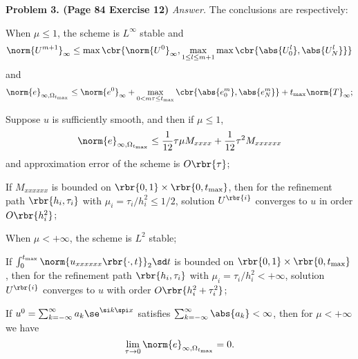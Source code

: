 \documentclass[english, nochinese]{pnote}
\begin{document}
\textbf{Problem 3. (Page 84 Exercise 12)} \textit{Answer.} The conclusions are respectively:
\begin{partlist}
\item When $ \mu \le 1 $, the scheme is $L^{\infty}$ stable and
\begin{equation}
\norm{U^{ m + 1 }}_{\infty} \le \max \cbr{ \norm{U^0}_{\infty}, \max_{ 1 \le l \le m + 1 } \max \cbr{ \abs{U_0^l}, \abs{U_N^l} } }
\end{equation}
and
\begin{equation}
\norm{e}_{ \infty, \Omega_{t_{\text{max}}} } \le \norm{e^0}_{\infty} + \max_{ 0 < m \tau \le t_{\text{max}}} \cbr{ \abs{e_0^m}, \abs{e_N^m} } + t_{\text{max}} \norm{T}_{\infty};
\end{equation}
\item Suppose $u$ is sufficiently smooth, and then if $ \mu \le 1 $,
\begin{equation}
\norm{e}_{ \infty, \Omega_{t_{\text{max}}} } \le \frac{1}{12} \tau \mu M_{ x x x x } + \frac{1}{12} \tau^2 M_{ x x x x x x }
\end{equation}
and approximation error of the scheme is $ O \rbr{\tau} $;
\item If $ M_{ x x x x x x } $ is bounded on $ \rbr{ 0, 1 } \times \rbr{ 0, t_{\text{max}} } $, then for the refinement path $ \rbr{ h_i, \tau_i } $ with $ \mu_i = \tau_i / h_i^2 \le 1 / 2 $, solution $U^{\rbr{i}}$ converges to $u$ in order $ O \rbr{h_i^2} $;
\item When $ \mu < +\infty $, the scheme is $L^2$ stable;
\item If $ \int_0^{t_{\text{max}}} \norm{ u_{ x x x x x x } \rbr{ \cdot, t } }_2 \sd t $ is bounded on $ \rbr{ 0, 1 } \times \rbr{ 0, t_{\text{max}} } $, then for the refinement path $ \rbr{ h_i, \tau_i } $ with $ \mu_i = \tau_i / h_i^2 < +\infty $, solution $U^{\rbr{i}}$ converges to $u$ with order $ O \rbr{ h_i^2 + \tau_i^2 } $;
\item If $ u^0 = \sum_{ k = -\infty }^{\infty} a_k \se^{ \si k \spi x } $ satisfies $ \sum_{ k = -\infty }^{\infty} \abs{a_k} < \infty $, then for $ \mu < +\infty $ we have
\begin{equation}
\lim_{ \tau \rightarrow 0 } \norm{e}_{ \infty, \Omega_{t_{\text{max}}} } = 0.
\end{equation}
\end{partlist}
\end{document}
